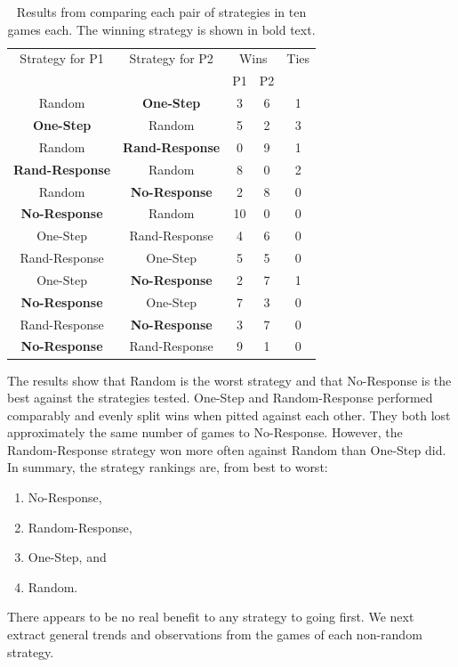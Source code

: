 \documentclass{sig-alternate}
\newcommand{\highlightrow}{}  %
\begin{document}
\begin{table}[h!tb]
\begin{center}
\begin{tabular}{|c|c|c|c|c|} \hline
\highlightrow
 Strategy for P1 & Strategy for P2 & \multicolumn{2}{c|}{Wins} & Ties \\ \cline{3-4}
\highlightrow & & P1 & P2 & \\ \hline
Random & {\bf One-Step} & 3 & 6 & 1 \\
{\bf One-Step} & Random &5 & 2 & 3 \\
Random & {\bf Rand-Response} & 0 & 9 & 1 \\
{\bf Rand-Response} & Random & 8 & 0 & 2 \\
Random & {\bf No-Response} & 2 & 8 & 0 \\
{\bf No-Response} & Random & 10 & 0 & 0 \\
One-Step & Rand-Response & 4 & 6 & 0 \\
Rand-Response & One-Step & 5 & 5 & 0 \\
One-Step & {\bf No-Response} & 2 & 7 & 1 \\
{\bf No-Response} & One-Step & 7 & 3 & 0 \\
Rand-Response & {\bf No-Response} &  3 & 7 & 0 \\
{\bf No-Response} & Rand-Response & 9 & 1 & 0 \\
\hline
\end{tabular}
\caption{Results from comparing each pair of strategies in ten games each. The winning strategy is shown in bold text.\label{tab:results}}
\end{center}
\end{table}

The results show that Random is the worst strategy and that No-Response is the best against the strategies tested. 
One-Step and Random-Response performed comparably and evenly split wins when pitted against each other. They both lost approximately the same number of games to No-Response. 
However, the Random-Response strategy won more often against Random than One-Step did.
In summary, the strategy rankings are, from best to worst:
\begin{enumerate}
\item No-Response, 
\item Random-Response, 
\item One-Step, and 
\item Random.
\end{enumerate}
There appears to be no real benefit to any strategy to going first.
We next extract general trends and observations from the games of each non-random strategy.
\end{document}
